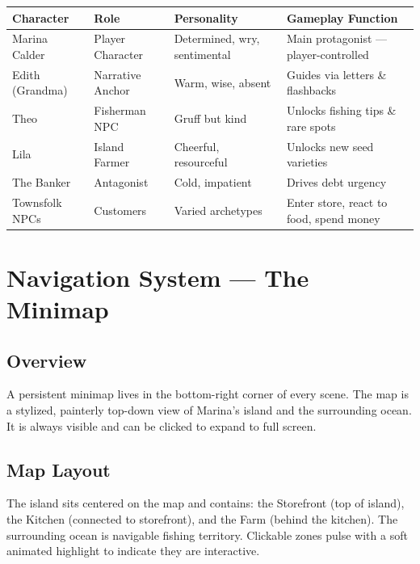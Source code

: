\documentclass[11pt, letterpaper]{article}
\newcommand{\altrow}{\rowcolor{rowalt}}
\begin{document}
\vspace{4pt}
\begin{tabularx}{\textwidth}{L{2.8cm} L{2.4cm} L{3cm} L{5.4cm}}
\toprule
{}
\textbf{\color{white}Character} & \textbf{\color{white}Role} & \textbf{\color{white}Personality} & \textbf{\color{white}Gameplay Function} \\
\midrule
Marina Calder   & Player Character  & Determined, wry, sentimental & Main protagonist --- player-controlled \\
\altrow
Edith (Grandma) & Narrative Anchor  & Warm, wise, absent           & Guides via letters \& flashbacks \\
Theo            & Fisherman NPC     & Gruff but kind               & Unlocks fishing tips \& rare spots \\
\altrow
Lila            & Island Farmer     & Cheerful, resourceful        & Unlocks new seed varieties \\
The Banker      & Antagonist        & Cold, impatient              & Drives debt urgency \\
\altrow
Townsfolk NPCs  & Customers         & Varied archetypes            & Enter store, react to food, spend money \\
\bottomrule
\end{tabularx}

\section{Navigation System --- The Minimap}

\subsection{Overview}

A persistent minimap lives in the bottom-right corner of every scene. The map is a stylized, painterly top-down view of Marina's island and the surrounding ocean. It is always visible and can be clicked to expand to full screen.

\subsection{Map Layout}

\begin{goldbox}
The island sits centered on the map and contains: the Storefront (top of island), the Kitchen (connected to storefront), and the Farm (behind the kitchen). The surrounding ocean is navigable fishing territory. Clickable zones pulse with a soft animated highlight to indicate they are interactive.
\end{goldbox}
\end{document}
